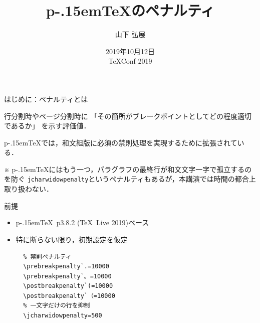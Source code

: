 \documentclass[a5paper,dvipdfmx,14pt]{beamer}
\def\cs#1{\texttt{\char92\nobreak#1}}
\def\pTeX{p\kern-.15em\TeX}
\begin{document}
\title{\pTeX のペナルティ}
\author{山下 弘展}
\date{2019年10月12日\\\TeX Conf 2019}
\begin{frame}
  \maketitle
\end{frame}

\begin{frame}{はじめに：ペナルティとは}
\begin{tcolorbox}[colframe=black!70!green,colback=white!90!blue!90!green,
  coltitle=white,fonttitle=\bfseries,
  title=\TeX におけるペナルティ(penalty)]
  行分割時やページ分割時に
  「その箇所がブレークポイントとしてどの程度適切であるか」
  を示す評価値．
\end{tcolorbox}
\leavevmode\null\par
\pTeX では，和文組版に必須の禁則処理を実現するために拡張されている．\par\bigskip
{\footnotesize
 ※ \pTeX にはもう一つ，パラグラフの最終行が和文文字一字で孤立するのを防ぐ
 \cs{jcharwidowpenalty}というペナルティもあるが，本講演では時間の都合上取り扱わない．}
\end{frame}

\begin{frame}[fragile]{前提}
\begin{itemize}
\item \pTeX~p3.8.2 (\TeX\ Live 2019)ベース
\item 特に断らない限り，初期設定を仮定
{\small
\begin{verbatim}
  % 禁則ペナルティ
  \prebreakpenalty`.=10000
  \prebreakpenalty`。=10000
  \postbreakpenalty`(=10000
  \postbreakpenalty`（=10000
  % 一文字だけの行を抑制
  \jcharwidowpenalty=500
\end{verbatim}
}
\end{itemize}
\end{frame}
\end{document}

